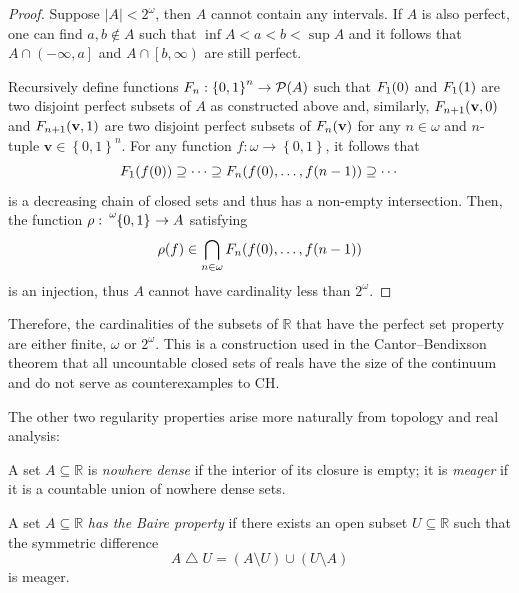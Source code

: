 \documentclass[12pt]{article}
\theoremstyle{plain}
\theoremstyle{definition}
\newcommand{\CH}{\mathrm{CH}}
\begin{document}
\begin{proof}
	Suppose $\left|A\right| < 2^\omega$, then $A$ cannot contain any intervals. If $A$ is also perfect, one can find $a, b \not\in A$ such that $\inf A < a < b < \sup A$ and it follows that $A \cap \left(-\infty, a\right]$ and $A \cap \left[b,\infty\right)$ are still perfect.

	Recursively define functions $F_n : \left\{0, 1\right\}^n \rightarrow \mathcal{P}\mleft(A\mright)$ such that $F_1\mleft(0\mright)$ and $F_1\mleft(1\mright)$ are two disjoint perfect subsets of $A$ as constructed above and, similarly, $F_{n + 1}\mleft(\mathbf{v}, 0\mright)$ and $F_{n + 1}\mleft(\mathbf{v}, 1\mright)$ are two disjoint perfect subsets of $F_n\mleft(\mathbf{v}\mright)$ for any $n \in \omega$ and $n$-tuple $\mathbf{v} \in \left\{0, 1\right\}^n$. For any function $f : \omega \rightarrow \left\{0, 1\right\}$, it follows that
	\[F_1\mleft(f\mleft(0\mright)\mright) \supseteq \cdots \supseteq F_n\mleft(f\mleft(0\mright), \ldots, f\mleft(n - 1\mright)\mright) \supseteq \cdots\]
	is a decreasing chain of closed sets and thus has a non-empty intersection. Then, the function $\rho : \tensor[^\omega]{\left\{0, 1\right\}}{} \rightarrow A$ satisfying
	\[\rho\mleft(f\mright) \in \bigcap_{n \in \omega} F_n\mleft(f\mleft(0\mright), \ldots, f\mleft(n - 1\mright)\mright)\]
	is an injection, thus $A$ cannot have cardinality less than $2^\omega$.
\end{proof}

Therefore, the cardinalities of the subsets of $\mathbb{R}$ that have the perfect set property are either finite, $\omega$ or $2^\omega$. This is a construction used in the Cantor--Bendixson theorem that all uncountable closed sets of reals have the size of the continuum and do not serve as counterexamples to $\CH$.

The other two regularity properties arise more naturally from topology and real analysis:

\begin{definition}
	A set $A \subseteq \mathbb{R}$ is \emph{nowhere dense} if the interior of its closure is empty; it is \emph{meager} if it is a countable union of nowhere dense sets.

	A set $A \subseteq \mathbb{R}$ \emph{has the Baire property} if there exists an open subset $U \subseteq \mathbb{R}$ such that the symmetric difference
	\[A \mathop{\triangle} U = \left(A \setminus U\right) \cup \left(U \setminus A\right)\]
	is meager.
\end{definition}
\end{document}
